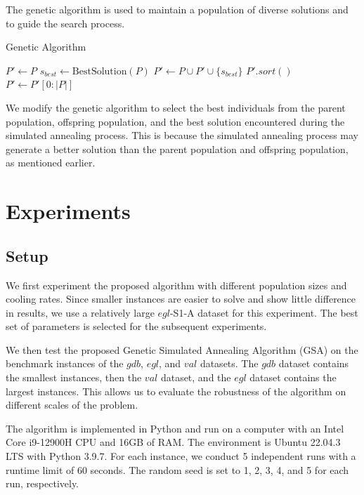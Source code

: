 \documentclass[conference]{IEEEtran}
\begin{document}
The genetic algorithm is used to maintain a population of diverse solutions and to guide the search process.
\begin{algorithm}
    \caption{Genetic Algorithm}
    $P' \leftarrow P$\;
    $s_{best} \leftarrow \text{BestSolution}(P)$\;
    $P' \leftarrow P \cup P' \cup \{s_{best}\}$\;
    $P'.sort()$\;
    $P' \leftarrow P'[0:|P|]$\;
\end{algorithm}

We modify the genetic algorithm to select the best individuals from the parent population, offspring population, and the best solution encountered during the simulated annealing process.
This is because the simulated annealing process may generate a better solution than the parent population and offspring population, as mentioned earlier.

\section{Experiments}
\label{sec:experiments}

\subsection{Setup}

We first experiment the proposed algorithm with different population sizes and cooling rates.
Since smaller instances are easier to solve and show little difference in results, we use a relatively large $egl$-S1-A dataset for this experiment.
The best set of parameters is selected for the subsequent experiments.

We then test the proposed Genetic Simulated Annealing Algorithm (GSA) on the benchmark instances of the $gdb$, $egl$, and $val$ datasets.
The $gdb$ dataset contains the smallest instances, then the $val$ dataset, and the $egl$ dataset contains the largest instances.
This allows us to evaluate the robustness of the algorithm on different scales of the problem.

The algorithm is implemented in Python and run on a computer with an Intel Core i9-12900H CPU and 16GB of RAM.
The environment is Ubuntu 22.04.3 LTS with Python 3.9.7.
For each instance, we conduct 5 independent runs with a runtime limit of 60 seconds.
The random seed is set to 1, 2, 3, 4, and 5 for each run, respectively.
\end{document}
